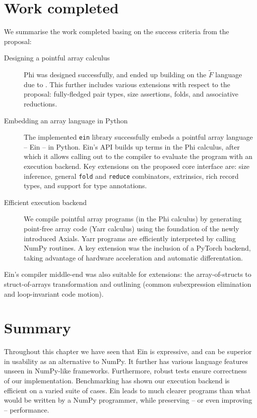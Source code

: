 \section{Work completed}

We summarise the work completed basing on the success criteria from the proposal: \begin{description}
    \item[Designing a pointful array calculus] Phi was designed successfully, and ended up building on the $\tilde F$ language due to \textcite{shaikhha2019efficient}. This further includes various extensions with respect to the proposal: fully-fledged pair types, size assertions, folds, and associative reductions.
    \item[Embedding an array language in Python] The implemented \texttt{ein} library successfully embeds a pointful array language -- Ein -- in Python. Ein's API builds up terms in the Phi calculus, after which it allows calling out to the compiler to evaluate the program with an execution backend. Key extensions on the proposed core interface are: size inference, general \texttt{fold} and \texttt{reduce} combinators, extrinsics, rich record types, and support for type annotations.
    \item[Efficient execution backend] We compile pointful array programs (in the Phi calculus) by generating point-free array code (Yarr calculus) using the foundation of the newly introduced Axials. Yarr programs are efficiently interpreted by calling NumPy routines. A key extension was the inclusion of a PyTorch backend, taking advantage of hardware acceleration and automatic differentation.
\end{description}
Ein's compiler middle-end was also suitable for extensions: the array-of-structs to struct-of-arrays transformation and outlining (common subexpression elimination and loop-invariant code motion).


\needspace{2em}
\section{Summary}

Throughout this chapter we have seen that Ein is expressive, and can be superior in usability as an alternative to NumPy. 
It further has various language features unseen in NumPy-like frameworks.
Furthermore, robust tests ensure correctness of our implementation. 
Benchmarking has shown our execution backend is efficient on a varied suite of cases. 
Ein leads to much clearer programs than what would be written by a NumPy programmer, while preserving -- or even improving -- performance. 
